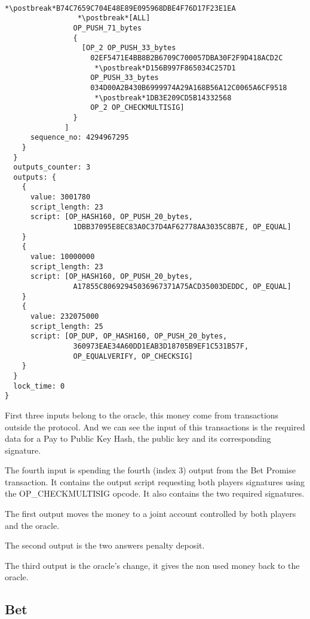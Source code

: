 \begin{lstlisting}
                 *\postbreak*B74C7659C704E48E89E095968DBE4F76D17F23E1EA
                 *\postbreak*[ALL]
                OP_PUSH_71_bytes
                {
                  [OP_2 OP_PUSH_33_bytes
                    02EF5471E4BB8B2B6709C700057DBA30F2F9D418ACD2C
                     *\postbreak*D156B997F865034C257D1
                    OP_PUSH_33_bytes
                    034D00A2B430B6999974A29A168B56A12C0065A6CF9518
                     *\postbreak*1DB3E209CD5B14332568
                    OP_2 OP_CHECKMULTISIG]
                }
              ]
      sequence_no: 4294967295
    }
  }
  outputs_counter: 3
  outputs: {
    {
      value: 3001780
      script_length: 23
      script: [OP_HASH160, OP_PUSH_20_bytes,
                1DBB37095E8EC83A0C37D4AF62778AA3035C8B7E, OP_EQUAL]
    }
    {
      value: 10000000
      script_length: 23
      script: [OP_HASH160, OP_PUSH_20_bytes,
                A17855C80692945036967371A75ACD35003DEDDC, OP_EQUAL]
    }
    {
      value: 232075000
      script_length: 25
      script: [OP_DUP, OP_HASH160, OP_PUSH_20_bytes,
                360973EAE34A60DD1EAB3D18705B9EF1C531B57F,
                OP_EQUALVERIFY, OP_CHECKSIG]
    }
  }
  lock_time: 0
}
\end{lstlisting}

First three inputs belong to the oracle, this money come from transactions
  outside the protocol.
And we can see the input of this transactions is the required data for a
  Pay to Public Key Hash, the public key and its corresponding signature.

The fourth input is spending the fourth (index 3) output from the Bet Promise
  transaction.
It contains the output script requesting both players signatures using the
  OP\_CHECKMULTISIG opcode.
It also contains the two required signatures.

The first output moves the money to a joint account controlled by both players
  and the oracle.

The second output is the two answers penalty deposit.

The third output is the oracle's change, it gives the non used money back to
  the oracle.

\subsection{Bet}

